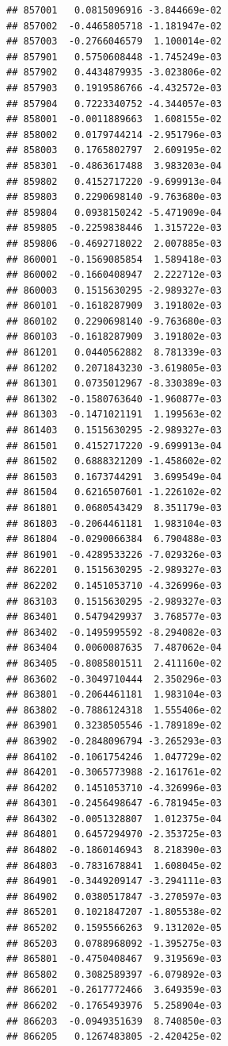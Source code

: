 \documentclass[ignorenonframetext,]{beamer}
\begin{document}
\begin{frame}[fragile]
\begin{verbatim}
## 857001   0.0815096916 -3.844669e-02
## 857002  -0.4465805718 -1.181947e-02
## 857003  -0.2766046579  1.100014e-02
## 857901   0.5750608448 -1.745249e-03
## 857902   0.4434879935 -3.023806e-02
## 857903   0.1919586766 -4.432572e-03
## 857904   0.7223340752 -4.344057e-03
## 858001  -0.0011889663  1.608155e-02
## 858002   0.0179744214 -2.951796e-03
## 858003   0.1765802797  2.609195e-02
## 858301  -0.4863617488  3.983203e-04
## 859802   0.4152717220 -9.699913e-04
## 859803   0.2290698140 -9.763680e-03
## 859804   0.0938150242 -5.471909e-04
## 859805  -0.2259838446  1.315722e-03
## 859806  -0.4692718022  2.007885e-03
## 860001  -0.1569085854  1.589418e-03
## 860002  -0.1660408947  2.222712e-03
## 860003   0.1515630295 -2.989327e-03
## 860101  -0.1618287909  3.191802e-03
## 860102   0.2290698140 -9.763680e-03
## 860103  -0.1618287909  3.191802e-03
## 861201   0.0440562882  8.781339e-03
## 861202   0.2071843230 -3.619805e-03
## 861301   0.0735012967 -8.330389e-03
## 861302  -0.1580763640 -1.960877e-03
## 861303  -0.1471021191  1.199563e-02
## 861403   0.1515630295 -2.989327e-03
## 861501   0.4152717220 -9.699913e-04
## 861502   0.6888321209 -1.458602e-02
## 861503   0.1673744291  3.699549e-04
## 861504   0.6216507601 -1.226102e-02
## 861801   0.0680543429  8.351179e-03
## 861803  -0.2064461181  1.983104e-03
## 861804  -0.0290066384  6.790488e-03
## 861901  -0.4289533226 -7.029326e-03
## 862201   0.1515630295 -2.989327e-03
## 862202   0.1451053710 -4.326996e-03
## 863103   0.1515630295 -2.989327e-03
## 863401   0.5479429937  3.768577e-03
## 863402  -0.1495995592 -8.294082e-03
## 863404   0.0060087635  7.487062e-04
## 863405  -0.8085801511  2.411160e-02
## 863602  -0.3049710444  2.350296e-03
## 863801  -0.2064461181  1.983104e-03
## 863802  -0.7886124318  1.555406e-02
## 863901   0.3238505546 -1.789189e-02
## 863902  -0.2848096794 -3.265293e-03
## 864102  -0.1061754246  1.047729e-02
## 864201  -0.3065773988 -2.161761e-02
## 864202   0.1451053710 -4.326996e-03
## 864301  -0.2456498647 -6.781945e-03
## 864302  -0.0051328807  1.012375e-04
## 864801   0.6457294970 -2.353725e-03
## 864802  -0.1860146943  8.218390e-03
## 864803  -0.7831678841  1.608045e-02
## 864901  -0.3449209147 -3.294111e-03
## 864902   0.0380517847 -3.270597e-03
## 865201   0.1021847207 -1.805538e-02
## 865202   0.1595566263  9.131202e-05
## 865203   0.0788968092 -1.395275e-03
## 865801  -0.4750408467  9.319569e-03
## 865802   0.3082589397 -6.079892e-03
## 866201  -0.2617772466  3.649359e-03
## 866202  -0.1765493976  5.258904e-03
## 866203  -0.0949351639  8.740850e-03
## 866205   0.1267483805 -2.420425e-02

\end{verbatim}
\end{frame}
\end{document}
